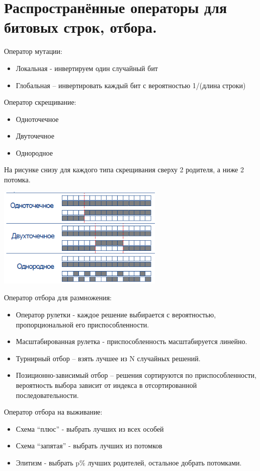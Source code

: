 \section{Распространённые операторы для битовых строк, отбора.}

Оператор мутации:

\begin{itemize}
      \item Локальная - инвертируем один случайный бит
      \item Глобальная – инвертировать каждый бит с вероятностью 1/(длина строки)
   \end{itemize}

Оператор скрещивание:

\begin{itemize}
      \item Одноточечное
      \item Двуточечное
      \item Однородное
   \end{itemize}

На рисунке снизу для каждого типа скрещивания сверху 2 родителя, а ниже 2 потомка. 

\includegraphics[width=300]{images/14bilet.png}  

Оператор отбора для размножения:

\begin{itemize}
      \item Оператор рулетки - каждое решение выбирается с вероятностью, пропорциональной его приспособленности.
      \item Масштабированная рулетка - приспособленность масштабируется линейно.
      \item Турнирный отбор – взять лучшее из N случайных решений.
      \item Позиционно-зависимый отбор – решения сортируются по приспособленности, вероятность выбора зависит от индекса в отсортированной последовательности.
   \end{itemize}

Оператор отбора на выживание:

\begin{itemize}
      \item Схема “плюс” - выбрать лучших из всех особей
      \item Схема “запятая” -  выбрать лучших из потомков
      \item Элитизм -  выбрать p\%  лучших родителей, остальное добрать потомками.
   \end{itemize}